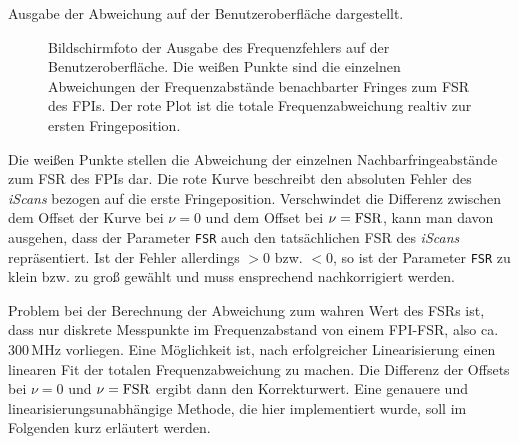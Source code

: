 Ausgabe der Abweichung auf der Benutzeroberfläche dargestellt.
\begin{figure}[h]
 	\centering
	\caption[Benutzeroberfläche Linearisierung -
	Frequenzfehler]{Bildschirmfoto der Ausgabe des Frequenzfehlers
	auf der Benutzeroberfläche. Die weißen Punkte sind die einzelnen Abweichungen
	der Frequenzabstände benachbarter Fringes zum FSR des FPIs. Der rote Plot ist
	die totale Frequenzabweichung realtiv zur ersten Fringeposition.}
	\label{fig:linearisierung_benutzeroberflaeche_frequenz-abweichung}
\end{figure}
Die weißen Punkte stellen die Abweichung der einzelnen Nachbarfringeabstände zum
FSR des FPIs dar. Die rote Kurve beschreibt den absoluten Fehler des
\textit{iScans} bezogen auf die erste Fringeposition. Verschwindet die
Differenz zwischen dem Offset der Kurve bei $\nu=0$ und dem Offset bei
$\nu=\text{\lstinline|FSR|}$, kann man davon ausgehen, dass der Parameter
\lstinline|FSR| auch den tatsächlichen FSR des \textit{iScans} repräsentiert.
Ist der Fehler allerdings $>0$ bzw. $<0$, so
ist der Parameter \lstinline|FSR| zu klein bzw. zu groß gewählt und muss
ensprechend nachkorrigiert werden.\par
Problem bei der Berechnung der Abweichung
zum wahren Wert des FSRs ist, dass nur diskrete Messpunkte im Frequenzabstand
von einem FPI-FSR, also ca. $300\,$MHz vorliegen. Eine Möglichkeit ist, nach
erfolgreicher Linearisierung einen linearen Fit der totalen Frequenzabweichung
zu machen. Die Differenz der Offsets bei $\nu=0$ und
$\nu=\text{\lstinline|FSR|}$ ergibt dann den Korrekturwert. Eine genauere und
linearisierungsunabhängige Methode, die hier implementiert wurde, soll im
Folgenden kurz erläutert werden.\par
